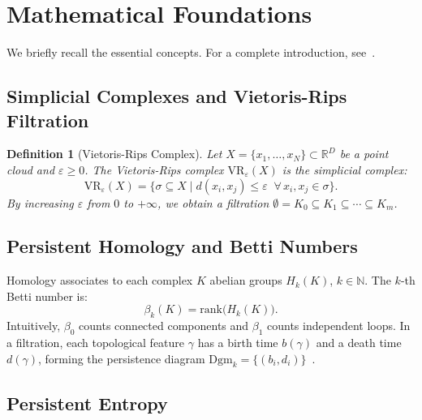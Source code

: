 \documentclass[11pt,a4paper]{article}
\newtheorem{definition}{Definition}[section]
\newcommand{\R}{\mathbb{R}}
\newcommand{\N}{\mathbb{N}}
\newcommand{\Hk}{H_k}
\newcommand{\betti}{\beta}
\newcommand{\VR}{\mathrm{VR}}
\newcommand{\Dgm}{\mathrm{Dgm}}
\begin{document}
\section{Mathematical Foundations}
\label{sec:background}

We briefly recall the essential concepts. For a complete introduction,
see~\cite{Edelsbrunner2009ComputationalTA, chazal2021introductiontopologicaldataanalysis}.

\subsection{Simplicial Complexes and Vietoris-Rips Filtration}

\begin{definition}[Vietoris-Rips Complex]
\label{def:rips}
Let $X = \{x_1, \ldots, x_N\} \subset \R^D$ be a point cloud and
$\varepsilon \geqslant 0$. The Vietoris-Rips complex
$\VR_\varepsilon(X)$ is the simplicial complex:
\[
  \VR_\varepsilon(X) = \bigl\{ \sigma \subseteq X \;\big|\;
  d(x_i, x_j) \leqslant \varepsilon \;\;\forall\, x_i, x_j \in \sigma
  \bigr\}.
\]
By increasing $\varepsilon$ from $0$ to $+\infty$, we obtain a 
filtration $\emptyset = K_0 \subseteq K_1 \subseteq \cdots
\subseteq K_m$.
\end{definition}

\subsection{Persistent Homology and Betti Numbers}

Homology associates to each complex $K$ abelian groups $\Hk(K)$, $k \in \N$.
The $k$-th Betti number is:
\begin{equation}
  \betti_k(K) = \mathrm{rank}\bigl(\Hk(K)\bigr).
  \label{eq:betti}
\end{equation}
Intuitively, $\betti_0$ counts connected components and $\betti_1$ counts
independent loops. In a filtration, each topological feature $\gamma$ has
a birth time $b(\gamma)$ and a death time $d(\gamma)$, forming the
persistence diagram $\Dgm_k = \{(b_i, d_i)\}$~\cite{Edelsbrunner2002}.

\subsection{Persistent Entropy}
\end{document}
